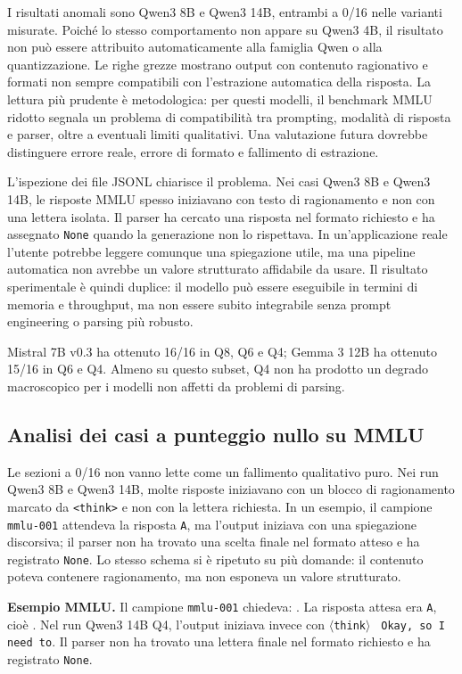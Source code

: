 I risultati anomali sono Qwen3 8B e Qwen3 14B, entrambi a 0/16 nelle varianti
misurate. Poiché lo stesso comportamento non appare su Qwen3 4B, il risultato
non può essere attribuito automaticamente alla famiglia Qwen o alla
quantizzazione. Le righe grezze mostrano output con contenuto ragionativo e
formati non sempre compatibili con l'estrazione automatica della risposta. La
lettura più prudente è metodologica: per questi modelli, il benchmark MMLU
ridotto segnala un problema di compatibilità tra prompting, modalità di
risposta e parser, oltre a eventuali limiti qualitativi. Una valutazione futura
dovrebbe distinguere errore reale, errore di formato e fallimento di estrazione.

L'ispezione dei file JSONL chiarisce il problema. Nei casi Qwen3 8B e Qwen3
14B, le risposte MMLU spesso iniziavano con testo di ragionamento e non con una
lettera isolata. Il parser ha cercato una risposta nel formato richiesto e ha
assegnato \texttt{None} quando la generazione non lo rispettava. In un'applicazione reale
l'utente potrebbe leggere comunque una spiegazione utile, ma una pipeline
automatica non avrebbe un valore strutturato affidabile da usare. Il risultato
sperimentale è quindi duplice: il modello può essere eseguibile in termini di
memoria e throughput, ma non essere subito integrabile senza prompt engineering
o parsing più robusto.

Mistral 7B v0.3 ha ottenuto 16/16 in Q8, Q6 e Q4; Gemma 3 12B ha ottenuto
15/16 in Q6 e Q4. Almeno su questo subset, Q4 non ha prodotto un degrado
macroscopico per i modelli non affetti da problemi di parsing.

\subsection{Analisi dei casi a punteggio nullo su MMLU}
\label{subsec:evaluation_mmlu_zero}

Le sezioni a 0/16 non vanno lette come un fallimento qualitativo puro. Nei run
Qwen3 8B e Qwen3 14B, molte risposte iniziavano con un blocco di ragionamento
marcato da \texttt{<think>} e non con la lettera richiesta. In un esempio, il
campione \texttt{mmlu-001} attendeva la risposta \texttt{A}, ma l'output
iniziava con una spiegazione discorsiva; il parser non ha trovato una scelta
finale nel formato atteso e ha registrato \texttt{None}. Lo stesso schema si
è ripetuto su più domande: il contenuto poteva contenere ragionamento, ma non
esponeva un valore strutturato.

\begin{center}
\begin{minipage}{0.88\textwidth}
\small
\textbf{Esempio MMLU.} Il campione \texttt{mmlu-001} chiedeva: . La risposta attesa era
\texttt{A}, cioè . Nel run Qwen3 14B Q4,
l'output iniziava invece con \(\langle\)\texttt{think}\(\rangle\)
\texttt{ Okay, so I need to}. Il parser non ha trovato una lettera finale nel
formato richiesto e ha registrato \texttt{None}.
\end{minipage}
\end{center}

